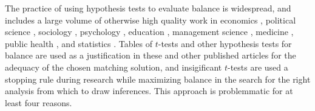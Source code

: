 \documentclass[11pt,titlepage]{article}
\begin{document}
The practice of using hypothesis tests to evaluate balance is
widespread, and includes a large volume of otherwise high quality work
in economics \citep{MilFreMcH03,BlaSmi04,AgoDyn04,DehWah99,
  DehWah02,SmiTod05}, political science \citep{Imai05,SimHop05,
  Lassen05}, sociology \citep{Harding03,DiPGan04,LunSmi05}, psychology
\citep{HavNag05,HilWalBro05,YosMagBos03,JonDAgGon04,McCRidMor04},
education \citep{Crosnoe05,SchBuc03}, management science
\citep{FreMil04, Villalonga04,WanSchAvo05}, medicine
\citep{WanSchAvo05, MacRivJur06,LinPekWan06,ManTudDie06, PetRoeMul06,
  ShiLitPot06,SabCanGib05,PerUndZho00,AusMam06,AusMamStu05}, public
health \citep{NovReaRau06,ElBGilWu05,LauSmiSta00,BinBreEar05}, and
statistics \citep{LuZanHor01}.  Tables of $t$-tests and other
hypothesis tests for balance are used as a justification in these and
other published articles for the adequacy of the chosen matching
solution, and insigificant $t$-tests are used a stopping rule during
research while maximizing balance in the search for the right analysis
from which to draw inferences.  This approach is problemmatic for at
least four reasons.
\end{document}
